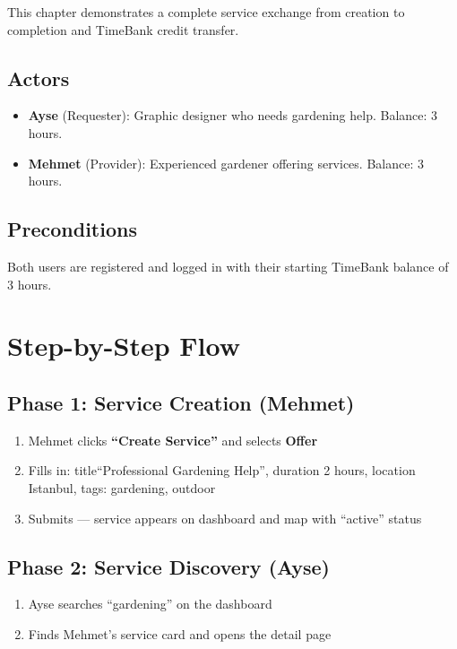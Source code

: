 \documentclass[11pt,a4paper]{report}
\begin{document}
This chapter demonstrates a complete service exchange from creation to completion and TimeBank credit transfer.

\subsection{Actors}

\begin{itemize}
    \item \textbf{Ayse} (Requester): Graphic designer who needs gardening help. Balance: 3 hours.
    \item \textbf{Mehmet} (Provider): Experienced gardener offering services. Balance: 3 hours.
\end{itemize}

\subsection{Preconditions}

Both users are registered and logged in with their starting TimeBank balance of 3 hours.

\section{Step-by-Step Flow}

\subsection{Phase 1: Service Creation (Mehmet)}

\begin{enumerate}
    \item Mehmet clicks \textbf{``Create Service''} and selects \textbf{Offer}
    \item Fills in: title``Professional Gardening Help'', duration 2 hours, location Istanbul, tags: gardening, outdoor
    \item Submits --- service appears on dashboard and map with ``active'' status
\end{enumerate}

\subsection{Phase 2: Service Discovery (Ayse)}

\begin{enumerate}
    \item Ayse searches ``gardening'' on the dashboard
    \item Finds Mehmet's service card and opens the detail page
\end{enumerate}
\end{document}
